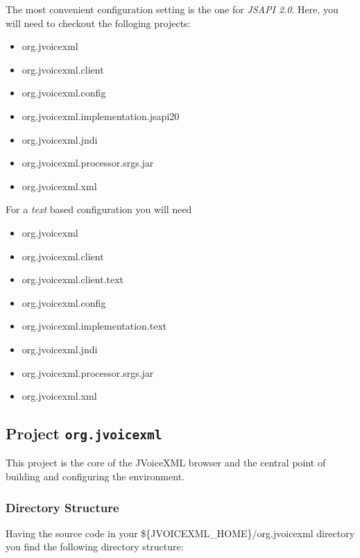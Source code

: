 \documentclass[11pt,a4paper]{article}
\begin{document}
The most convenient configuration setting is the one for \emph{JSAPI 2.0}. Here,
you will need to checkout the folloging projects:
\begin{itemize}
  \item org.jvoicexml
  \item org.jvoicexml.client
  \item org.jvoicexml.config
  \item org.jvoicexml.implementation.jsapi20
  \item org.jvoicexml.jndi
  \item org.jvoicexml.processor.srgs.jar
  \item org.jvoicexml.xml
\end{itemize}

For a \emph{text} based configuration you will need
\begin{itemize}
  \item org.jvoicexml
  \item org.jvoicexml.client
  \item org.jvoicexml.client.text
  \item org.jvoicexml.config
  \item org.jvoicexml.implementation.text
  \item org.jvoicexml.jndi
  \item org.jvoicexml.processor.srgs.jar
  \item org.jvoicexml.xml
\end{itemize}

\subsection{Project \texttt{org.jvoicexml}}

This project is the core of the JVoiceXML browser and the central point of
building and configuring the environment.

\subsubsection{Directory Structure}
\label{sec:directory-structure}

Having the source code in your \$\{JVOICEXML\_HOME\}/org.jvoicexml
directory you find the following directory structure:
\end{document}
